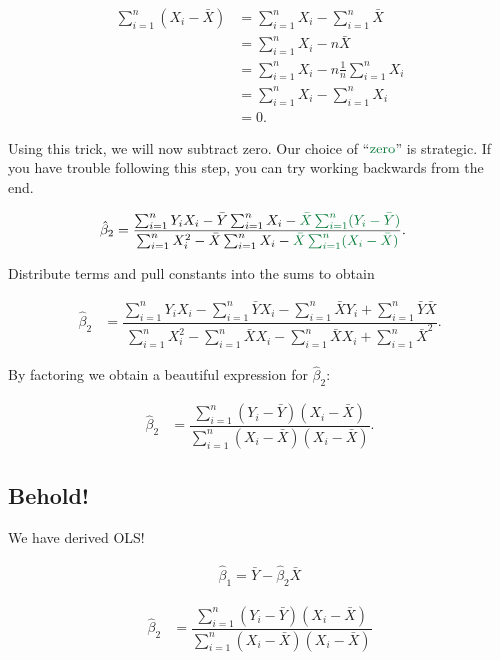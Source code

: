\documentclass[12pt]{exam}
\begin{document}
\begin{align}
\sum_{i=1}^n (X_i - \bar{X}) &= \sum_{i=1}^n X_i - \sum_{i=1}^n \bar{X} \\
							 &= \sum_{i=1}^n X_i  - n\bar{X} \\
							 &= \sum_{i=1}^n X_i - n \frac{1}{n} \sum_{i=1}^n X_i \\
							 &= \sum_{i=1}^n X_i - \sum_{i=1}^n X_i \\
							 &= 0.
\end{align}


\noindent Using this trick, we will now subtract zero. Our choice of ``$\color{pine_green}{\text{zero}}$'' is strategic. If you have trouble following this step, you can try working backwards from the end.

\begin{align}
\hat{\beta}_2 &= \dfrac{\sum_{i=1}^n Y_i X_i -  \bar{Y} \sum_{i=1}^n X_i - \color{pine_green}{\bar{X} \sum_{i=1}^n (Y_i - \bar{Y})}} {\sum_{i=1}^n X_i^2 - \bar{X} \sum_{i=1}^n X_i - \color{pine_green}{\bar{X} \sum_{i=1}^n  (X_i - \bar{X}) }}.
\end{align}

\noindent Distribute terms and pull constants into the sums to obtain

\begin{align}
\hat{\beta}_2 &= \dfrac{\sum_{i=1}^n Y_i X_i -   \sum_{i=1}^n \bar{Y} X_i - \sum_{i=1}^n \bar{X} Y_i + \sum_{i=1}^n \bar{Y} \bar{X}} {\sum_{i=1}^n X_i^2 -  \sum_{i=1}^n \bar{X} X_i - \sum_{i=1}^n \bar{X} X_i + \sum_{i=1}^n \bar{X}^2 }.
\end{align}

\noindent By factoring we obtain a beautiful expression for $\hat{\beta}_2$:

\begin{align}
\hat{\beta}_2 &= \dfrac{\sum_{i=1}^n (Y_i - \bar{Y})(X_i - \bar{X})} {\sum_{i=1}^n (X_i - \bar{X}) (X_i - \bar{X})}.
\end{align}

\subsection*{Behold!}

\noindent We have derived OLS!

\begin{align}
\hat{\beta}_1 = \bar{Y} - \hat{\beta}_2 \bar{X}
\end{align}

\begin{align}
\hat{\beta}_2 &= \dfrac{\sum_{i=1}^n (Y_i - \bar{Y})(X_i - \bar{X})} {\sum_{i=1}^n (X_i - \bar{X}) (X_i - \bar{X})}
\end{align}
\end{document}
